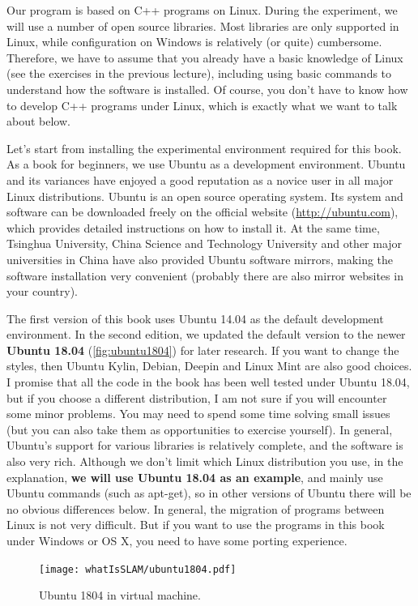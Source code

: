 Our program is based on C++ programs on Linux. During the experiment, we will use a number of open source libraries. Most libraries are only supported in Linux, while configuration on Windows is relatively (or quite) cumbersome. Therefore, we have to assume that you already have a basic knowledge of Linux (see the exercises in the previous lecture), including using basic commands to understand how the software is installed. Of course, you don't have to know how to develop C++ programs under Linux, which is exactly what we want to talk about below.

Let's start from installing the experimental environment required for this book. As a book for beginners, we use Ubuntu as a development environment. Ubuntu and its variances have enjoyed a good reputation as a novice user in all major Linux distributions. Ubuntu is an open source operating system. Its system and software can be downloaded freely on the official website (\url{http://ubuntu.com}), which provides detailed instructions on how to install it. At the same time, Tsinghua University, China Science and Technology University and other major universities in China have also provided Ubuntu software mirrors, making the software installation very convenient (probably there are also mirror websites in your country).

The first version of this book uses Ubuntu 14.04 as the default development environment. In the second edition, we updated the default version to the newer \textbf{Ubuntu 18.04} (\autoref{fig:ubuntu1804}) for later research. If you want to change the styles, then Ubuntu Kylin, Debian, Deepin and Linux Mint are also good choices. I promise that all the code in the book has been well tested under Ubuntu 18.04, but if you choose a different distribution, I am not sure if you will encounter some minor problems. You may need to spend some time solving small issues (but you can also take them as opportunities to exercise yourself). In general, Ubuntu's support for various libraries is relatively complete, and the software is also very rich. Although we don't limit which Linux distribution you use, in the explanation, \textbf{we will use Ubuntu 18.04 as an example}, and mainly use Ubuntu commands (such as apt-get), so in other versions of Ubuntu there will be no obvious differences below. In general, the migration of programs between Linux is not very difficult. But if you want to use the programs in this book under Windows or OS X, you need to have some porting experience.

\begin{figure}[!ht]
    \centering
    \texttt{[image: whatIsSLAM/ubuntu1804.pdf]}
    \caption{Ubuntu 1804 in virtual machine.}
    \label{fig:ubuntu1804}
\end{figure}

